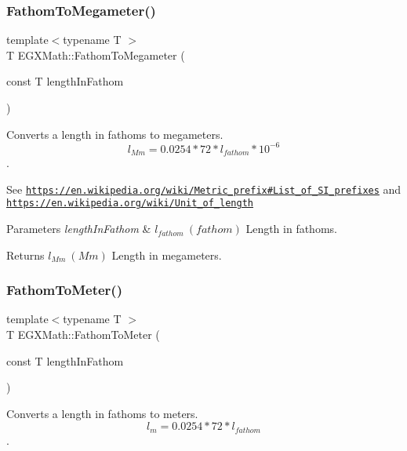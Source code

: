 \subsubsection{\texorpdfstring{Fathom\+To\+Megameter()}{FathomToMegameter()}}
{\footnotesize\ttfamily template$<$typename T $>$ \\
T E\+G\+X\+Math\+::\+Fathom\+To\+Megameter (\begin{DoxyParamCaption}\item[{const T}]{length\+In\+Fathom }\end{DoxyParamCaption})}



Converts a length in fathoms to megameters. \[ l_{Mm}=0.0254 * 72 * l_{fathom} * 10^{-6} \]. 

See \href{https://en.wikipedia.org/wiki/Metric_prefix#List_of_SI_prefixes}{\tt https\+://en.\+wikipedia.\+org/wiki/\+Metric\+\_\+prefix\#\+List\+\_\+of\+\_\+\+S\+I\+\_\+prefixes} and \href{https://en.wikipedia.org/wiki/Unit_of_length}{\tt https\+://en.\+wikipedia.\+org/wiki/\+Unit\+\_\+of\+\_\+length} 
\begin{DoxyParams}{Parameters}
{\em length\+In\+Fathom} & $ l_{fathom}\ (fathom)$ Length in fathoms. \\
\hline
\end{DoxyParams}
\begin{DoxyReturn}{Returns}
$ l_{Mm}\ (Mm)$ Length in megameters. 
\end{DoxyReturn}
\mbox{\label{group___e_g_x_math-_conversions-_length_conversions-_nautical-_fathom-_s_i_ga10d9caaa366193cb8c3b086cfc47a56d}} 
\subsubsection{\texorpdfstring{Fathom\+To\+Meter()}{FathomToMeter()}}
{\footnotesize\ttfamily template$<$typename T $>$ \\
T E\+G\+X\+Math\+::\+Fathom\+To\+Meter (\begin{DoxyParamCaption}\item[{const T}]{length\+In\+Fathom }\end{DoxyParamCaption})}



Converts a length in fathoms to meters. \[ l_{m}=0.0254 * 72 * l_{fathom} \]. 


